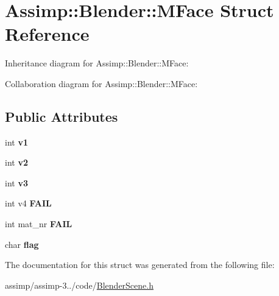 \hypertarget{struct_assimp_1_1_blender_1_1_m_face}{\section{Assimp\+:\+:Blender\+:\+:M\+Face Struct Reference}
\label{struct_assimp_1_1_blender_1_1_m_face}
}


Inheritance diagram for Assimp\+:\+:Blender\+:\+:M\+Face\+:


Collaboration diagram for Assimp\+:\+:Blender\+:\+:M\+Face\+:
\subsection*{Public Attributes}
\begin{DoxyCompactItemize}
\item 
\hypertarget{struct_assimp_1_1_blender_1_1_m_face_a09c2bad4e9ab20f87520404e9f2b570d}{int {\bfseries v1}}\label{struct_assimp_1_1_blender_1_1_m_face_a09c2bad4e9ab20f87520404e9f2b570d}

\item 
\hypertarget{struct_assimp_1_1_blender_1_1_m_face_ac42788f87b3a90bd4bdb59e44d5364df}{int {\bfseries v2}}\label{struct_assimp_1_1_blender_1_1_m_face_ac42788f87b3a90bd4bdb59e44d5364df}

\item 
\hypertarget{struct_assimp_1_1_blender_1_1_m_face_a53721e44ff9115f6ecfacd02e5229888}{int {\bfseries v3}}\label{struct_assimp_1_1_blender_1_1_m_face_a53721e44ff9115f6ecfacd02e5229888}

\item 
\hypertarget{struct_assimp_1_1_blender_1_1_m_face_a6aa21540c5431631094f66461cfc3195}{int v4 {\bfseries F\+A\+I\+L}}\label{struct_assimp_1_1_blender_1_1_m_face_a6aa21540c5431631094f66461cfc3195}

\item 
\hypertarget{struct_assimp_1_1_blender_1_1_m_face_ab6c8db9de35222257b65595a49751235}{int mat\+\_\+nr {\bfseries F\+A\+I\+L}}\label{struct_assimp_1_1_blender_1_1_m_face_ab6c8db9de35222257b65595a49751235}

\item 
\hypertarget{struct_assimp_1_1_blender_1_1_m_face_a4c715aa4a5f50913841c659fa09e65db}{char {\bfseries flag}}\label{struct_assimp_1_1_blender_1_1_m_face_a4c715aa4a5f50913841c659fa09e65db}

\end{DoxyCompactItemize}


The documentation for this struct was generated from the following file\+:\begin{DoxyCompactItemize}
\item 
assimp/assimp-\/3../code/\hyperlink{_blender_scene_8h}{Blender\+Scene.\+h}\end{DoxyCompactItemize}
